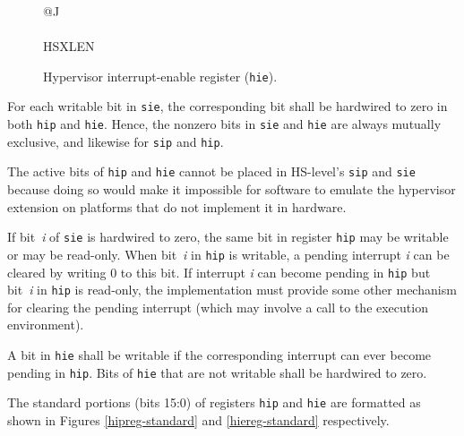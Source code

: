 \begin{figure}[h!]
{\footnotesize
\begin{center}
\begin{tabular}{@{}J}
 \\
\hline
{} \\
\hline
HSXLEN \\
\end{tabular}
\end{center}
}
\vspace{-0.1in}
\caption{Hypervisor interrupt-enable register ({\tt hie}).}
\label{hiereg}
\end{figure}

For each writable bit in {\tt sie}, the corresponding bit shall be
hardwired to zero in both {\tt hip} and {\tt hie}.
Hence, the nonzero bits in {\tt sie} and {\tt hie} are always mutually
exclusive, and likewise for {\tt sip} and {\tt hip}.

\begin{commentary}
The active bits of {\tt hip} and {\tt hie} cannot be placed in HS-level's
{\tt sip} and {\tt sie} because doing so would make it impossible for
software to emulate the hypervisor extension on platforms that do not
implement it in hardware.
\end{commentary}

If bit~\textit{i} of {\tt sie} is hardwired to zero, the same bit in
register {\tt hip} may be writable or may be read-only.
When bit~\textit{i} in {\tt hip} is writable, a pending interrupt
\textit{i} can be cleared by writing 0 to this bit.
If interrupt \textit{i} can become pending in {\tt hip} but
bit~\textit{i} in {\tt hip} is read-only, the implementation must provide
some other mechanism for clearing the pending interrupt (which may
involve a call to the execution environment).

A bit in {\tt hie} shall be writable if the corresponding interrupt can
ever become pending in {\tt hip}.
Bits of {\tt hie} that are not writable shall be hardwired to zero.

The standard portions (bits 15:0) of registers {\tt hip} and {\tt hie}
are formatted as shown in Figures \ref{hipreg-standard} and
\ref{hiereg-standard} respectively.

